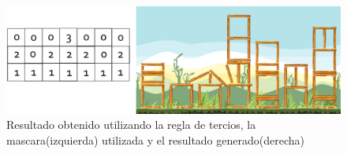 \begin{figure}
  \centering
  \includegraphics[width=1.0\textwidth]{img/result_example_thirds.png}
  \caption{Resultado obtenido utilizando la regla de tercios, la mascara(izquierda) utilizada y el resultado generado(derecha)}
  \label{figure:ruleofthird_on_chromosome}
\end{figure}

